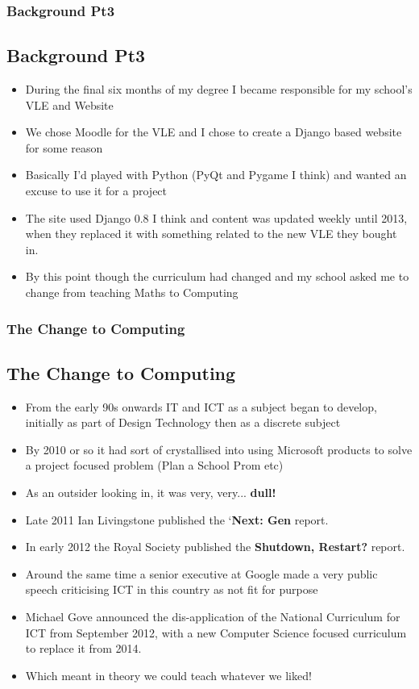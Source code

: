 \documentclass{beamer}
\begin{document}
\begin{frame}
  \frametitle{Background Pt3}
  \subsection{Background Pt3}

  \begin{itemize}
    \pause
  \item During the final six months of my degree I became responsible for my school's VLE and Website
    \pause
  \item We chose Moodle for the VLE and I chose to create a Django based website for some reason
    \pause
  \item Basically I'd played with Python (PyQt and Pygame I think) and wanted an excuse to use it for a project
    \pause
  \item The site used Django 0.8 I think and content was updated weekly until 2013, when they replaced it with
    something related to the new VLE they bought in.
    \pause
  \item By this point though the curriculum had changed and my school asked me to change from teaching Maths to
    Computing 
  \end{itemize}
\end{frame}

\begin{frame}
  \frametitle{The Change to Computing}
  \subsection{The Change to Computing}

  \begin{itemize}
    \pause
  \item From the early 90s onwards IT and ICT as a subject began to develop, initially as part of Design Technology then
    as a discrete subject
    \pause
  \item By 2010 or so it had sort of crystallised into using Microsoft products to solve a project focused problem (Plan
    a School Prom etc)
    \pause
  \item As an outsider looking in, it was very, very... \pause \textbf{dull!}
    \pause
  \item Late 2011 Ian Livingstone published the `\textbf{Next: Gen} report.
    \pause
  \item In early 2012 the Royal Society published the \textbf{Shutdown, Restart?} report.
    \pause
  \item Around the same time a senior executive at Google made a very public speech criticising ICT in this country as
    not fit for purpose
    \pause
  \item Michael Gove announced the dis-application of the National Curriculum for ICT from September 2012, with a new
    Computer Science focused curriculum to replace it from 2014.
    \pause
  \item Which meant in theory we could teach whatever we liked!
  \end{itemize}
\end{frame}
\end{document}
